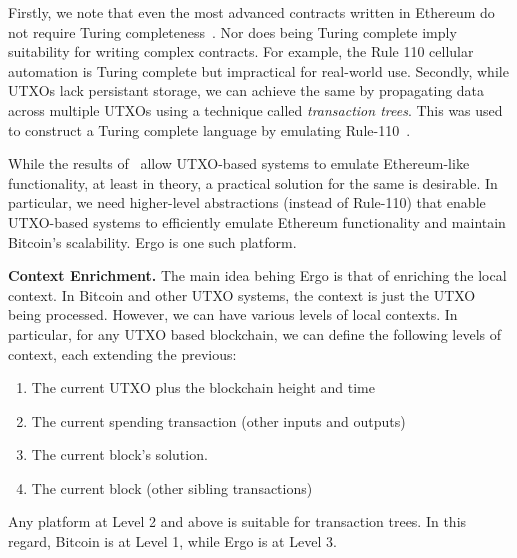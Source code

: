 \documentclass[runningheads]{llncs}
\begin{document}
Firstly, we note that even the most advanced contracts written in Ethereum do not require Turing completeness~\cite{hackernoon16,hackernoon17}. Nor does being Turing complete imply suitability for writing complex contracts. For example, the Rule 110 \cite{Cook_2009,neary2006p} 
cellular automation is Turing complete but impractical for real-world use. 
Secondly, while UTXOs lack persistant storage, we can achieve the same by propagating data across multiple UTXOs using a technique called {\em transaction trees}. 
This was used to construct a Turing complete language by emulating Rule-110~\cite{CKM18a}.

While the results of~\cite{CKM18a} allow UTXO-based systems to emulate Ethereum-like functionality, at least in theory, a practical solution for the same is desirable. In particular, we need higher-level abstractions (instead of Rule-110) that enable UTXO-based systems to efficiently emulate Ethereum functionality and maintain Bitcoin's scalability. Ergo is one such platform.

\textbf{Context Enrichment.} The main idea behing Ergo is that of enriching the local context. In Bitcoin and other UTXO systems, the context is just the UTXO being processed. However, we can have various levels of local contexts.
In particular, for any UTXO based blockchain, we can define the following levels of context, each extending the previous:
\begin{enumerate}
	\item The current UTXO plus the blockchain height and time
	\item The current spending transaction (other inputs and outputs)
	\item The current block's solution.
	\item The current block (other sibling transactions)
\end{enumerate}


Any platform at Level 2 and above is suitable for transaction trees. In this regard, Bitcoin is at Level 1, while Ergo is at Level 3. 
\end{document}

